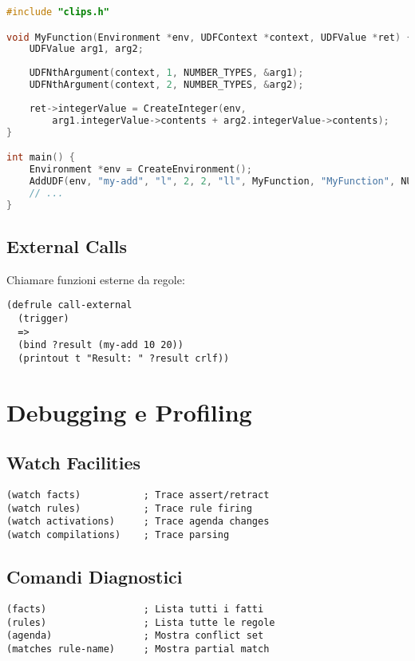 \begin{lstlisting}[language=C]
#include "clips.h"

void MyFunction(Environment *env, UDFContext *context, UDFValue *ret) {
    UDFValue arg1, arg2;
    
    UDFNthArgument(context, 1, NUMBER_TYPES, &arg1);
    UDFNthArgument(context, 2, NUMBER_TYPES, &arg2);
    
    ret->integerValue = CreateInteger(env, 
        arg1.integerValue->contents + arg2.integerValue->contents);
}

int main() {
    Environment *env = CreateEnvironment();
    AddUDF(env, "my-add", "l", 2, 2, "ll", MyFunction, "MyFunction", NULL);
    // ...
}
\end{lstlisting}

\subsection{External Calls}

Chiamare funzioni esterne da regole:

\begin{lstlisting}[language=CLIPS]
(defrule call-external
  (trigger)
  =>
  (bind ?result (my-add 10 20))
  (printout t "Result: " ?result crlf))
\end{lstlisting}

\section{Debugging e Profiling}

\subsection{Watch Facilities}

\begin{lstlisting}[language=CLIPS]
(watch facts)           ; Trace assert/retract
(watch rules)           ; Trace rule firing
(watch activations)     ; Trace agenda changes
(watch compilations)    ; Trace parsing
\end{lstlisting}

\subsection{Comandi Diagnostici}

\begin{lstlisting}[language=CLIPS]
(facts)                 ; Lista tutti i fatti
(rules)                 ; Lista tutte le regole
(agenda)                ; Mostra conflict set
(matches rule-name)     ; Mostra partial match
\end{lstlisting}

